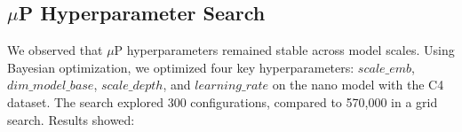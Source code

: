 \documentclass{article}
\begin{document}


\subsection{$\mu$P Hyperparameter Search}

We observed that $\mu$P hyperparameters remained stable across model scales. Using Bayesian optimization, we optimized four key hyperparameters: $scale\_emb$, $dim\_model\_base$, $scale\_depth$, and $learning\_rate$ on the nano model with the C4 dataset. The search explored 300 configurations, compared to 570,000 in a grid search. Results showed:

\end{document}

